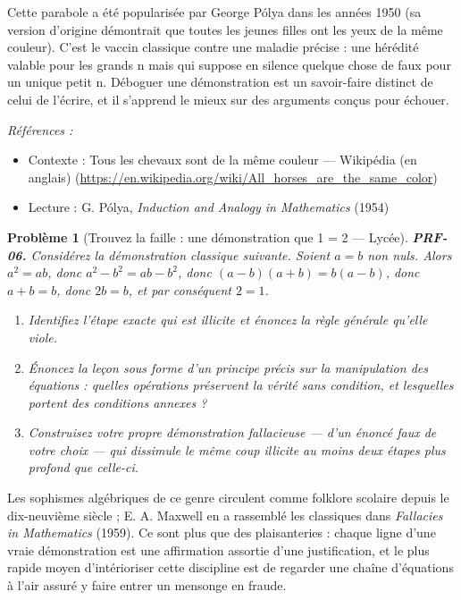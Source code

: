 \documentclass[11pt]{article}
\newtheorem{problem}{Problème}
\newenvironment{refs}{\par\small\noindent\emph{Références :}\begin{itemize}\setlength\itemsep{0pt}}{\end{itemize}\normalsize}
\begin{document}
\noindent Cette parabole a été popularisée par George Pólya dans les années 1950 (sa
version d'origine démontrait que toutes les jeunes filles ont les yeux de la même couleur).
C'est le vaccin classique contre une maladie précise : une hérédité valable pour les grands
n mais qui suppose en silence quelque chose de faux pour un unique petit n. Déboguer une
démonstration est un savoir-faire distinct de celui de l'écrire, et il s'apprend le mieux sur
des arguments conçus pour échouer.

\begin{refs}
\item Contexte : Tous les chevaux sont de la même couleur --- Wikipédia (en anglais) (\url{https://en.wikipedia.org/wiki/All_horses_are_the_same_color})
\item Lecture : G. Pólya, \textit{Induction and Analogy in Mathematics} (1954)
\end{refs}

\bigskip

\begin{problem}[{Trouvez la faille : une démonstration que 1 = 2 --- Lycée}]
\textbf{PRF-06.} Considérez la \og{} démonstration \fg{} classique suivante. \textit{Soient
$ a = b $ non nuls. Alors $ a^2 = ab $, donc $ a^2 - b^2 = ab - b^2 $, donc
$ (a-b)(a+b) = b(a-b) $, donc $ a + b = b $, donc $ 2b = b $, et par conséquent
$ 2 = 1 $.}
\begin{enumerate}
\item[(a)] Identifiez l'étape exacte qui est illicite et énoncez la règle générale qu'elle
viole.
\item[(b)] Énoncez la leçon sous forme d'un principe précis sur la manipulation des équations :
quelles opérations préservent la vérité sans condition, et lesquelles portent des
conditions annexes ?
\item[(c)] Construisez votre propre démonstration fallacieuse --- d'un énoncé faux de votre choix ---
qui dissimule le même coup illicite au moins deux étapes plus profond que celle-ci.
\end{enumerate}

\end{problem}

\noindent Les sophismes algébriques de ce genre circulent comme folklore scolaire
depuis le dix-neuvième siècle ; E. A. Maxwell en a rassemblé les classiques dans
\textit{Fallacies in Mathematics} (1959). Ce sont plus que des plaisanteries : chaque ligne
d'une vraie démonstration est une affirmation assortie d'une justification, et le plus
rapide moyen d'intérioriser cette discipline est de regarder une chaîne d'équations à l'air
assuré y faire entrer un mensonge en fraude.
\end{document}
